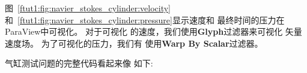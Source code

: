 图~\ref{ftut1:fig:navier_stokes_cylinder:velocity}和~\ref{ftut1:fig:navier_stokes_cylinder:pressure}显示速度和
最终时间的压力在ParaView中可视化。 对于可视化
的速度，我们使用\textbf{Glyph}过滤器来可视化
矢量速度场。 为了可视化的压力，我们有
使用\textbf{Warp By Scalar}过滤器。



气缸测试问题的完整代码看起来像
如下:

